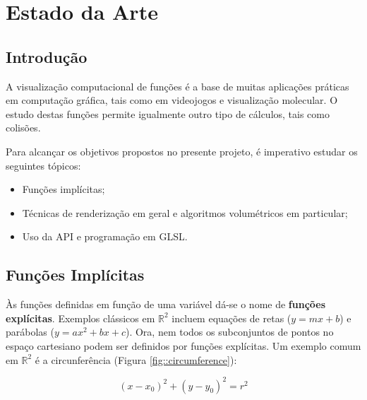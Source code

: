 \chapter{Estado da Arte}
\label{ch::arte}

\section{Introdução}
\label{sec::arte:intro}

A visualização computacional de funções é a base de muitas aplicações práticas em computação gráfica, tais como em videojogos e visualização molecular. O estudo destas funções permite igualmente outro tipo de cálculos, tais como colisões.

Para alcançar os objetivos propostos no presente projeto, é imperativo estudar os seguintes tópicos:

\begin{itemize}
	\item Funções implícitas;
	\item Técnicas de renderização em geral e algoritmos volumétricos em particular;
	\item Uso da \ac{API} \opengl e programação em \ac{GLSL}.
\end{itemize}


\section{Funções Implícitas}
\label{sec::arte:implicitas}



Às funções definidas em função de uma variável dá-se o nome de \textbf{funções explícitas}. Exemplos clássicos em $\mathbb{R}^2$ incluem equações de retas ($y = mx + b$) e parábolas ($y = ax^2 + bx + c$). Ora, nem todos os subconjuntos de pontos no espaço cartesiano podem ser definidos por funções explícitas. Um exemplo comum em $\mathbb{R}^2$ é a circunferência (Figura \ref{fig::circumference}):

\begin{equation}
	(x - x_0)^2 + (y - y_0)^2 = r^2
	\label{eq::circ_implicita}
\end{equation}

